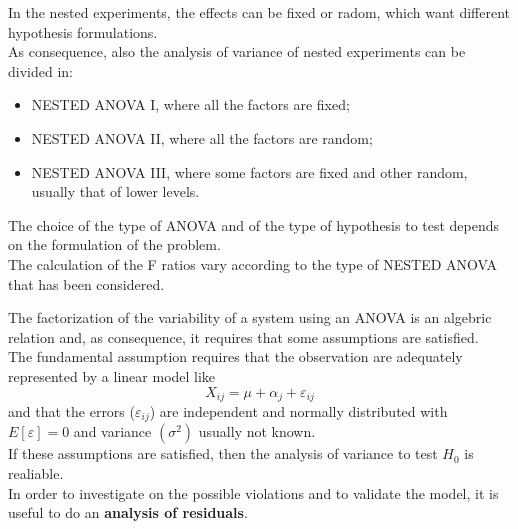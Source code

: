 \begin{frame}
  \vspace{.25cm}
  In the nested experiments, the effects can be fixed or radom, which want different hypothesis formulations.\\
  \vspace{.25cm}
  As consequence, also the analysis of variance of nested experiments can be divided in:
  \begin{itemize}
    \item NESTED ANOVA I, where all the factors are fixed;
    \item NESTED ANOVA II, where all the factors are random;
    \item NESTED ANOVA III, where some factors are fixed and other random, usually that of lower levels.
  \end{itemize}
  \vspace{.25cm}
  The choice of the type of ANOVA and of the type of hypothesis to test depends on the formulation of the problem.\\
  \vspace{.25cm}
  The calculation of the F ratios vary according to the type of NESTED ANOVA that has been considered.
\end{frame}




\begin{frame}
  The factorization of the variability of a system using an ANOVA is an algebric relation and, as consequence, it requires that some assumptions are satisfied.\\
  The fundamental assumption requires that the observation are adequately represented by a linear model like
  $$ X_{ij}=\mu+\alpha_j+\varepsilon_{ij} $$
  and that the errors ($ \varepsilon_{ij} $) are independent and normally distributed with $ E \left[ \varepsilon \right] = 0 $ and variance $(\sigma^2)$ usually not known.\\
  \vspace{0.2cm}
  If these assumptions are satisfied, then the analysis of variance to test $ H_0 $ is realiable.\\
  \vspace{0.2cm}
  In order to investigate on the possible violations and to validate the model, it is useful to do an \textbf{analysis of residuals}.
\end{frame}

